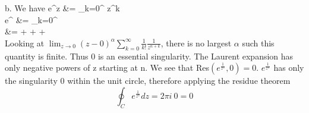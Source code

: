 \documentclass[12pt,twoside]{article}
\begin{document}
\item [b.]
We have
\ba
	e^z				&=	\sum_{k=0}^\infty {} z^k \\
	e^{}	&=	\sum_{k=0}^\infty {}  \\
					&= 	 +  +  + \cdots \\
\ea
Looking at $\lim_{z\rightarrow 0} (z-0)^\alpha \sum_{k=0}^\infty \frac{1}{k!} \frac{1}{z^{n+k}}$, there is no largest $\alpha$ such this quantity is finite.
Thus $0$ is an essential singularity. The Laurent expansion has only negative powers of z starting at n. We see that  Res$(e^{\frac{1}{z^n}}, 0) = 0$.
$e^{\frac{1}{z^n}}$ has only the singularity $0$ within the unit circle, therefore applying the residue theorem
\[
	 \oint_C e^{\frac{1}{z^n}} dz = 2 \pi i ~ 0 = 0
\]

\ee

\ee
\end{document}
